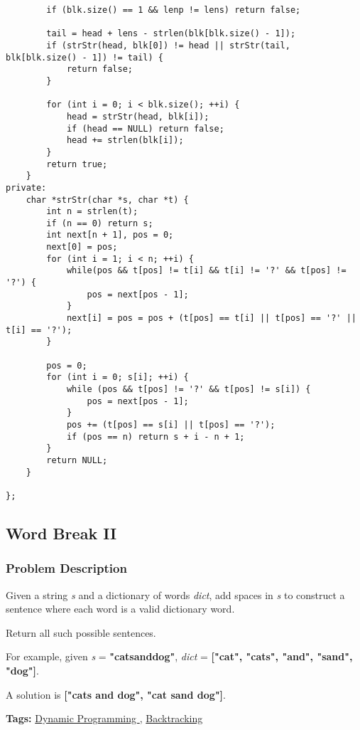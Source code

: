 \documentclass{article}
\begin{document}
\begin{CJK*}{UTF8}{gkai}
\begin{lstlisting}
        if (blk.size() == 1 && lenp != lens) return false;
        
        tail = head + lens - strlen(blk[blk.size() - 1]);
        if (strStr(head, blk[0]) != head || strStr(tail, blk[blk.size() - 1]) != tail) {
            return false;
        }
        
        for (int i = 0; i < blk.size(); ++i) {
            head = strStr(head, blk[i]);
            if (head == NULL) return false;
            head += strlen(blk[i]);
        }
        return true;
    }
private:
    char *strStr(char *s, char *t) {
        int n = strlen(t);
        if (n == 0) return s;
        int next[n + 1], pos = 0;
        next[0] = pos;
        for (int i = 1; i < n; ++i) {
            while(pos && t[pos] != t[i] && t[i] != '?' && t[pos] != '?') {
                pos = next[pos - 1];
            }
            next[i] = pos = pos + (t[pos] == t[i] || t[pos] == '?' || t[i] == '?');
        }

        pos = 0;
        for (int i = 0; s[i]; ++i) {
            while (pos && t[pos] != '?' && t[pos] != s[i]) {
                pos = next[pos - 1];
            }
            pos += (t[pos] == s[i] || t[pos] == '?');
            if (pos == n) return s + i - n + 1;
        }
        return NULL;
    }
    
}; 
\end{lstlisting}


\subsection{ Word Break II }
\label{ Word Break II }

\subsubsection*{Problem Description}
Given a string \emph{s} and a dictionary of words \emph{dict}, add spaces in \emph{s} to construct a sentence where each word is a valid dictionary word.

Return all such possible sentences.

For example, given
\emph{s} = \textbf{"catsanddog"},
\emph{dict} = \textbf{["cat", "cats", "and", "sand", "dog"]}.

A solution is \textbf{["cats and dog", "cat sand dog"]}.


\textbf{Tags: }
\hyperref[ Dynamic Programming ]{ Dynamic Programming },  \hyperref[ Backtracking ]{ Backtracking }




\end{CJK*}
\end{document}
